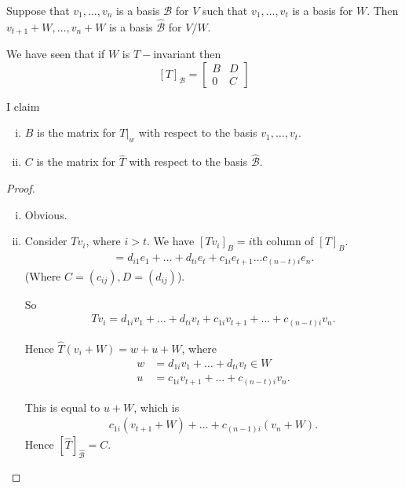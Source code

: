 \documentclass{article}
\theoremstyle{definition} \newtheorem*{definition}{Definition}
\begin{document}
 Suppose that $v_1, \dots, v_n$ is a basis $\mathcal{B}$ for $V$ such that 
 $v_1, \dots, v_t$ is a basis for $W$. Then
 $v_{t+1} + W, \dots , v_n + W$ is a basis $\hat{\mathcal{B}}$ for $V/W$.

 We have seen that if $W$ is $T-$invariant then 
 \[
   [T]_{\mathcal{B}} = 
      \begin{bmatrix}
        B & D \\
        0 & C
      \end{bmatrix}
 \]

 I claim 
 \begin{enumerate}[(i)]
   \item $B$ is the matrix for $T|_w$ with respect to the basis 
     $v_1, \dots, v_t$.
   \item $C$ is the matrix for $\hat{T}$ with respect to the basis
     $\hat{\mathcal{B}}$.
 \end{enumerate}

 \begin{proof}
   \begin{enumerate}[(i)]
     \item Obvious.
     \item Consider $Tv_i$, where $i>t$. We have 
       $[Tv_i]_B=i$th column of $[T]_B$.
       \begin{align*}
         = d_{i1}e_1 + \dots + d_{ti}e_t + c_{1i}e_{t+1} \dots 
         c_{(n-t) i}e_n.
       \end{align*}
       (Where $C = (c_{ij}), D = (d_{ij}) $).

       So 
       \begin{align*}
         Tv_i = d_{1i}v_1 + \dots + d_{ti} v_t + c_{1i} v_{t+1} + \dots 
         + c_{(n-t) i}v_n.
       \end{align*}

       Hence $\hat{T}(v_i + W)=w + u + W$, where
       \begin{align*}
         w &= d_{1i}v_1 + \dots + d_{ti} v_t \in W \\
         u &= c_{1i}v_{t+1} + \dots + c_{(n-t) i }v_n.
       \end{align*}

       This is equal to $u + W$, which is
       \begin{align*}
         c_{1i}(v_{t+1} + W) + \dots + c_{(n-1) i } (v_n + W).
       \end{align*}
       Hence $[\hat{T}]_{\hat{\mathcal{B}}}=C$.

   \end{enumerate}
 \end{proof}
\end{document}
